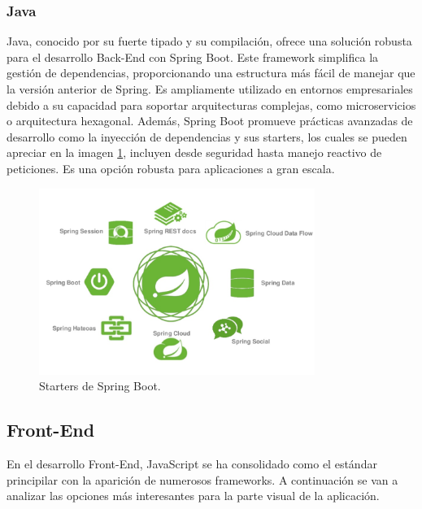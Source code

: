 \subsubsection*{Java}
Java, conocido por su fuerte tipado y su compilación, ofrece una solución robusta para el desarrollo Back-End con Spring Boot. Este framework simplifica la gestión de dependencias, proporcionando una estructura más fácil de manejar que la versión anterior de Spring. Es ampliamente utilizado en entornos empresariales debido a su capacidad para soportar arquitecturas complejas, como microservicios o arquitectura hexagonal. Además, Spring Boot promueve prácticas avanzadas de desarrollo como la inyección de dependencias y sus starters, los cuales se pueden apreciar en la imagen \ref{fig:spring}, incluyen desde seguridad hasta manejo reactivo de peticiones. Es una opción robusta para aplicaciones a gran escala. 
\begin{figure}[H]
    \centering
    \includegraphics[width=0.8\textwidth]{fotos/tete.png}
    \caption{Starters de Spring Boot\textbf{}.}
    \label{fig:spring}
\end{figure}
\subsection{Front-End}
En el desarrollo Front-End, JavaScript se ha consolidado como el estándar principilar con la aparición de numerosos frameworks. A continuación se van a analizar las opciones más interesantes para la parte visual de la aplicación.
